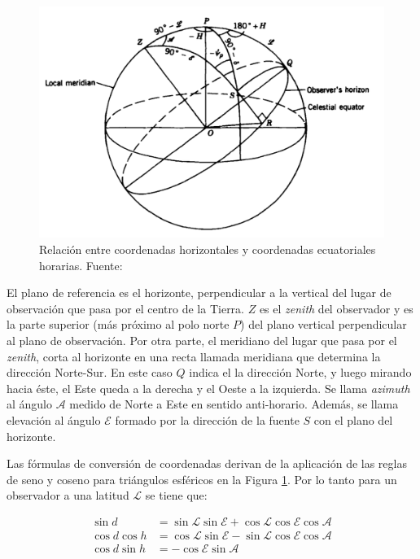 \begin{figure}[h!]
\centering
\includegraphics[scale=0.3]{images/horizontales.png}
\caption{Relación entre coordenadas horizontales y coordenadas ecuatoriales horarias. Fuente: \citep{libroAstro}}
\label{fig:horizontal}
\end{figure}

El plano de referencia es el horizonte, perpendicular a la vertical del lugar de observación que pasa por el centro de la Tierra. $Z$ es el \textit{zenith} del observador y es la parte superior (más próximo al polo norte $P$) del plano vertical perpendicular al plano de observación. Por otra parte, el meridiano del lugar que pasa por el \textit{zenith}, corta al horizonte en una recta llamada meridiana que determina la dirección Norte-Sur. En este caso $Q$ indica el la dirección Norte, y luego mirando hacia éste, el Este queda a la derecha y el Oeste a la izquierda. Se llama \textit{azimuth} al ángulo $\mathscr{A}$ medido de Norte a Este en sentido anti-horario. Además, se llama elevación al ángulo $\mathscr{E}$ formado por la dirección de la fuente $S$ con el plano del horizonte.

Las fórmulas de conversión de coordenadas derivan de la aplicación de las reglas de seno y coseno para triángulos esféricos en la Figura \ref{fig:horizontal}. Por lo tanto para un observador a una latitud $\mathscr{L}$ se tiene que:

\begin{align}
\sin{d} &= \sin{\mathscr{L}}\sin{\mathscr{E}}+\cos{\mathscr{L}}\cos{\mathscr{E}}\cos{\mathscr{A}} \nonumber\\
\cos{d}\cos{h} &= \cos{\mathscr{L}}\sin{\mathscr{E}} - \sin{\mathscr{L}}\cos{\mathscr{E}}\cos{\mathscr{A}}\\
\cos{d}\sin{h} &= -\cos{\mathscr{E}}\sin{\mathscr{A}} \nonumber
\label{eq:transformation}
\end{align}

